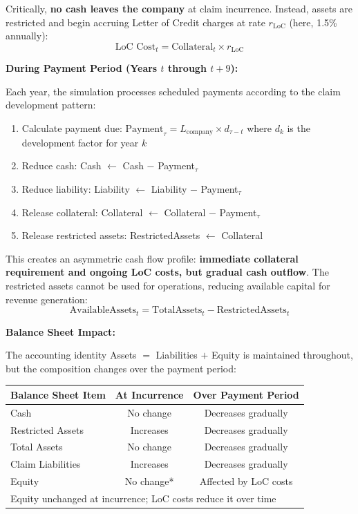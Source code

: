 \documentclass[11pt,letterpaper]{article}
\begin{document}
Critically, \textbf{no cash leaves the company} at claim incurrence. Instead, assets are restricted and begin accruing Letter of Credit charges at rate $r_{\text{LoC}}$ (here, 1.5\% annually):
\begin{equation}
\text{LoC Cost}_t = \text{Collateral}_t \times r_{\text{LoC}}
\end{equation}

\textbf{During Payment Period (Years $t$ through $t+9$):}

Each year, the simulation processes scheduled payments according to the claim development pattern:
\begin{enumerate}
    \item Calculate payment due: $\text{Payment}_{\tau} = L_{\text{company}} \times d_{\tau-t}$ where $d_k$ is the development factor for year $k$
    \item Reduce cash: Cash $\gets$ Cash $-$ Payment$_{\tau}$
    \item Reduce liability: Liability $\gets$ Liability $-$ Payment$_{\tau}$
    \item Release collateral: Collateral $\gets$ Collateral $-$ Payment$_{\tau}$
    \item Release restricted assets: RestrictedAssets $\gets$ Collateral
\end{enumerate}

This creates an asymmetric cash flow profile: \textbf{immediate collateral requirement and ongoing LoC costs, but gradual cash outflow}. The restricted assets cannot be used for operations, reducing available capital for revenue generation:
\begin{equation}
\text{AvailableAssets}_t = \text{TotalAssets}_t - \text{RestrictedAssets}_t
\end{equation}

\textbf{Balance Sheet Impact:}

The accounting identity Assets $=$ Liabilities $+$ Equity is maintained throughout, but the composition changes over the payment period:

\begin{center}
\begin{tabular}{lcc}
\toprule
\textbf{Balance Sheet Item} & \textbf{At Incurrence} & \textbf{Over Payment Period} \\
\midrule
Cash & No change & Decreases gradually \\
Restricted Assets & Increases & Decreases gradually \\
Total Assets & No change & Decreases gradually \\
Claim Liabilities & Increases & Decreases gradually \\
Equity & No change* & Affected by LoC costs \\
\bottomrule
\multicolumn{3}{l}{\small *Equity unchanged at incurrence; LoC costs reduce it over time}
\end{tabular}
\end{center}
\end{document}
